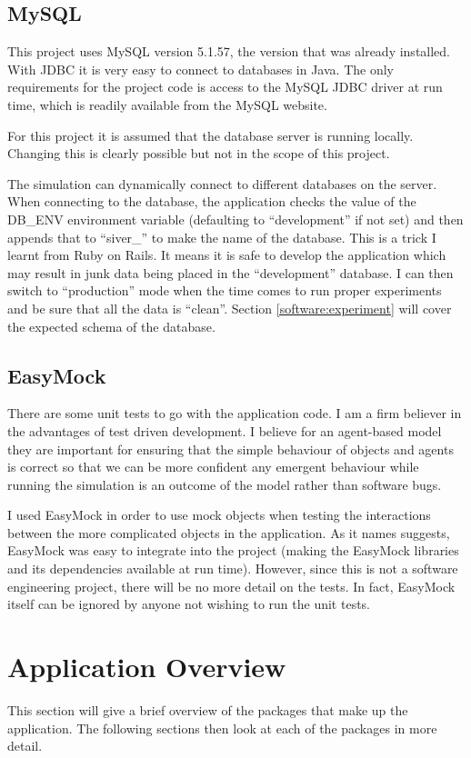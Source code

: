   \subsection{MySQL}
  This project uses MySQL version 5.1.57, the version that was already
  installed. With JDBC it is very easy to connect to databases in
  Java. The only requirements for the project code is access to the
  MySQL JDBC driver at run time, which is readily available from the
  MySQL website. 

  For this project it is assumed that the database server is running locally. Changing
  this is clearly possible but not in the scope of this project.

  The simulation can dynamically connect to different databases on the server. When connecting to the
  database, the application checks the value of the DB\_ENV
  environment variable (defaulting to ``development'' if not set) and then appends that to ``siver\_'' to make the
  name of the database. This is a trick I learnt from Ruby on
  Rails. It means it is safe to develop the application which may result
  in junk data being placed in the ``development'' database. I can then switch to ``production'' mode when the
  time comes to run proper experiments and be sure that
  all the data is ``clean''. Section \ref{software:experiment} will
  cover the expected schema of the database.


  \subsection{EasyMock}
  There are some unit tests to go with the application code. I am a
  firm believer in the advantages of test driven development. I
  believe for an agent-based model they are important for ensuring
  that the simple behaviour of objects and agents is correct so that
  we can be more confident any emergent behaviour while running the
  simulation is an outcome of the model rather than software
  bugs.

  I used EasyMock in order to use mock objects when testing the
  interactions between the more complicated objects in the
  application. As it names suggests, EasyMock was easy to integrate
  into the project (making the EasyMock libraries and its dependencies
  available at run time). However, since this is not a software
  engineering project, there will be no more detail on the tests. In
  fact, EasyMock itself can be ignored by anyone not wishing to run
  the unit tests.

\section{Application Overview}
This section will give a brief overview of the packages that make up
the application. The following sections then look at each of the
packages in more detail. 

